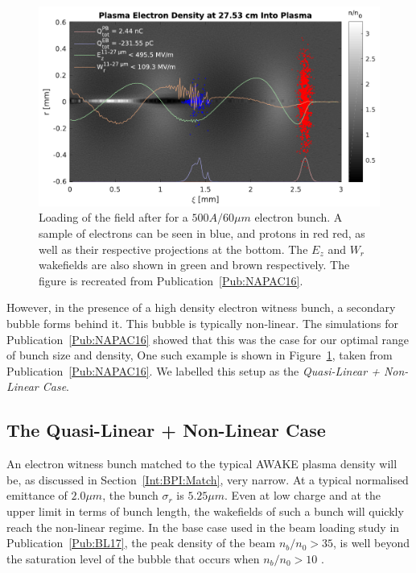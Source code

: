 \begin{figure}[hbt]
    \centering
    \includegraphics[width=0.8125\linewidth]{figures/NAPACPlasmaDensity}
    \caption{\label{Fig:SimA:NAPACPD}
        Loading of the field after for a $500\unit{A}/60\unit{\mu m}$ electron bunch.
        A sample of electrons can be seen in blue, and protons in red red, as well as their respective projections at the bottom.
        The $E_z$ and $W_r$ wakefields are also shown in green and brown respectively.
        The figure is recreated from Publication~\ref{Pub:NAPAC16}.
    }
\end{figure}

However, in the presence of a high density electron witness bunch, a secondary bubble forms behind it.
This bubble is typically non-linear.
The simulations for Publication~\ref{Pub:NAPAC16} showed that this was the case for our optimal range of bunch size and density,
One such example is shown in Figure~\ref{Fig:SimA:NAPACPD}, taken from Publication~\ref{Pub:NAPAC16}.
We labelled this setup as the \textit{Quasi-Linear + Non-Linear Case}.

\subsection{The Quasi-Linear + Non-Linear Case}
\label{SimA:QLinNonLin}

An electron witness bunch matched to the typical AWAKE plasma density will be, as discussed in Section~\ref{Int:BPI:Match}, very narrow.
At a typical normalised emittance of $2.0\unit{\mu m}$, the bunch $\sigma_r$ is $5.25\unit{\mu m}$.
Even at low charge and at the upper limit in terms of bunch length, the wakefields of such a bunch will quickly reach the non-linear regime.
In the base case used in the beam loading study in Publication~\ref{Pub:BL17}, the peak density of the beam $n_b/n_0 > 35$, is well beyond the saturation level of the bubble that occurs when $n_b/n_0 > 10$ \cite{lu:2005}.

